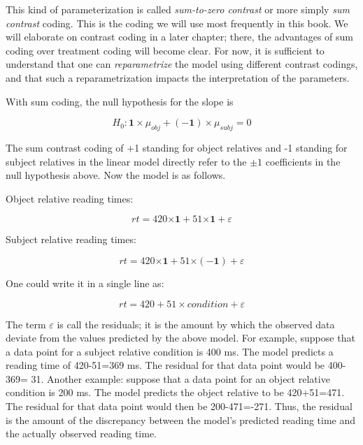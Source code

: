 \documentclass[12pt,]{krantz}
\begin{document}
This kind of parameterization is called \emph{sum-to-zero contrast} or more simply \emph{sum contrast} coding. This is the coding we will use most frequently in this book. We will elaborate on contrast coding in a later chapter; there, the advantages of sum coding over treatment coding will become clear. For now, it is sufficient to understand that one can \emph{reparametrize} the model using different contrast codings, and that such a reparametrization impacts the interpretation of the parameters.

With sum coding, the null hypothesis for the slope is

\begin{equation}
H_0: \mathbf{1\times} \mu_{obj} + (\mathbf{-1}) \times\mu_{subj} = 0   
\end{equation}

The sum contrast coding of +1 standing for object relatives and -1 standing for subject relatives in the linear model directly refer to the \(\pm 1\) coefficients in the null hypothesis above.
Now the model is as follows.

Object relative reading times:

\begin{equation}
rt = 420\mathbf{\times 1} + 51\mathbf{\times 1} + \varepsilon
\end{equation}

Subject relative reading times:

\begin{equation}
rt = 420\mathbf{\times 1} + 51\mathbf{\times (-1)} + \varepsilon
\end{equation}

One could write it in a single line as:

\begin{equation}
rt = 420 + 51\times condition + \varepsilon
\end{equation}

The term \(\varepsilon\) is call the residuals; it is the amount by which the observed data deviate from the values predicted by the above model. For example, suppose that a data point for a subject relative condition is 400 ms. The model predicts a reading time of 420-51=369 ms. The residual for that data point would be 400-369= 31. Another example: suppose that a data point for an object relative condition is 200 ms. The model predicts the object relative to be 420+51=471. The residual for that data point would then be 200-471=-271. Thus, the residual is the amount of the discrepancy between the model's predicted reading time and the actually observed reading time.
\end{document}
